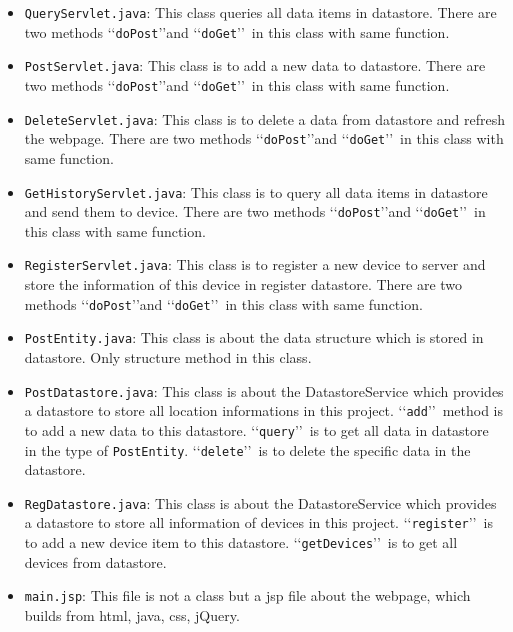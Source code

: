 \documentclass{article}
\begin{document}
\begin{itemize}
\item 
\verb`QueryServlet.java`:
This class queries all data items in datastore. There are two methods \lq\lq \verb`doPost`\rq\rq and \lq\lq \verb`doGet`\rq\rq  ~in this class with same function.

\item
\verb`PostServlet.java`:
This class is to add a new data to datastore. There are two methods \lq\lq \verb`doPost`\rq\rq and \lq\lq \verb`doGet`\rq\rq  ~in this class with same function.

\item
\verb`DeleteServlet.java`:
This class is to delete a data from datastore and refresh the webpage. There are two methods \lq\lq \verb`doPost`\rq\rq and \lq\lq \verb`doGet`\rq\rq  ~in this class with same function.

\item
\verb`GetHistoryServlet.java`:
This class is to query all data items in datastore and send them to device. There are two methods \lq\lq \verb`doPost`\rq\rq and \lq\lq \verb`doGet`\rq\rq  ~in this class with same function.

\item
\verb`RegisterServlet.java`:
This class is to register a new device to server and store the information of this device in register datastore. There are two methods \lq\lq \verb`doPost`\rq\rq and \lq\lq \verb`doGet`\rq\rq  ~in this class with same function.

\item
\verb`PostEntity.java`:
This class is about the data structure which is stored in datastore. Only structure method in this class.

\item
\verb`PostDatastore.java`:
This class is about the DatastoreService which provides a datastore to store all location informations in this project. \lq\lq \verb`add`\rq\rq ~method is to add a new data to this datastore. \lq\lq \verb`query`\rq\rq ~is to get all data in datastore in the type of \verb`PostEntity`. \lq\lq \verb`delete`\rq\rq ~is to delete the specific data in the datastore. 

\item
\verb`RegDatastore.java`:
This class is about the DatastoreService which provides a datastore to store all information of devices in this project. \lq\lq \verb`register`\rq\rq ~is to add a new device item to this datastore. \lq\lq \verb`getDevices`\rq\rq ~is to get all devices from datastore.

\item
\verb`main.jsp`:
This file is not a class but a jsp file about the webpage, which builds from html, java, css, jQuery.


\end{itemize}
\end{document}
